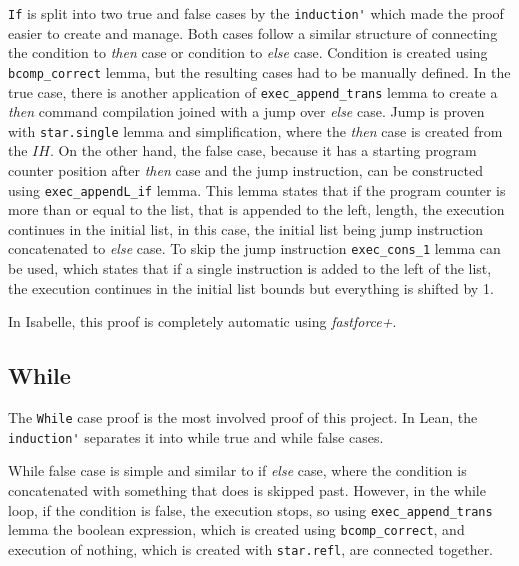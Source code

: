 \lstinline{If} is split into two true and false cases by the \lstinline{induction'} which made the proof easier to create and manage. Both cases follow a similar structure of connecting the condition to \emph{then} case or condition to \emph{else} case. Condition is created using \lstinline{bcomp_correct} lemma, but the resulting cases had to be manually defined. In the true case, there is another application of \lstinline{exec_append_trans} lemma to create a \emph{then} command compilation joined with a jump over \emph{else} case. Jump is proven with \lstinline{star.single} lemma and simplification, where the \emph{then} case is created from the $IH$. On the other hand, the false case, because it has a starting program counter position after \emph{then} case and the jump instruction, can be constructed using \lstinline{exec_appendL_if} lemma. This lemma states that if the program counter is more than or equal to the list, that is appended to the left, length, the execution continues in the initial list, in this case, the initial list being jump instruction concatenated to \emph{else} case. To skip the jump instruction \lstinline{exec_cons_1} lemma can be used, which states that if a single instruction is added to the left of the list, the execution continues in the initial list bounds but everything is shifted by 1. 

In Isabelle, this proof is completely automatic using \emph{fastforce+}.


\subsection{While}

The \lstinline{While} case proof is the most involved proof of this project. In Lean, the \lstinline{induction'} separates it into while true and while false cases. 

While false case is simple and similar to if \emph{else} case, where the condition is concatenated with something that does is skipped past. However, in the while loop, if the condition is false, the execution stops, so using \lstinline{exec_append_trans} lemma the boolean expression, which is created using \lstinline{bcomp_correct}, and execution of nothing, which is created with \lstinline{star.refl}, are connected together.

